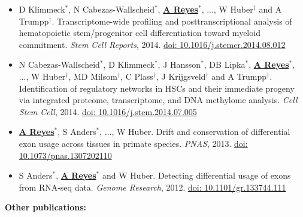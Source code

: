 \documentclass[11pt,a4paper,sans]{moderncv} %
\begin{document}
\begin{itemize}
\item D Klimmeck$^{\ast}$, N Cabezas-Wallscheid$^{\ast}$, \textbf{\underline{A Reyes}}$^{\ast}$, ..., W Huber$^{\dagger}$ and A Trumpp$^{\dagger}$. Transcriptome-wide profiling and posttranscriptional analysis of hematopoietic stem/progenitor cell differentiation toward myeloid commitment. \textit{Stem Cell Reports}, 2014. \href{https://doi.org/10.1016/j.stemcr.2014.08.012}{doi: 10.1016/j.stemcr.2014.08.012}
\item N Cabezas-Wallscheid$^{\ast}$, D Klimmeck$^{\ast}$, J Hansson$^{\ast}$, DB Lipka$^{\ast}$, \textbf{\underline{A Reyes}}$^{\ast}$, ..., W Huber$^{\dagger}$, MD Milsom$^{\dagger}$, C Plass$^{\dagger}$, J Krijgsveld$^{\dagger}$ and A Trumpp$^{\dagger}$. Identification of regulatory networks in HSCs and their immediate progeny via integrated proteome, transcriptome, and DNA methylome analysis. \textit{Cell Stem Cell}, 2014. \href{https://doi.org/10.1016/j.stem.2014.07.005}{doi: 10.1016/j.stem.2014.07.005}
\item \textbf{\underline{A Reyes}}$^{\ast}$, S Anders$^{\ast}$, ..., W Huber. Drift and conservation of differential exon usage across tissues in primate species. \textit{PNAS}, 2013. \href{https://doi.org/10.1073/pnas.1307202110}{doi: 10.1073/pnas.1307202110}
\item S Anders$^{\ast}$, \textbf{\underline{A Reyes}}$^{\ast}$ and W Huber. Detecting differential usage of exons from RNA-seq data. \textit{Genome Research}, 2012. \href{https://doi.org/10.1101/gr.133744.111}{doi: 10.1101/gr.133744.111}
\end{itemize}
\vspace{.1cm}
\textbf{Other publications:}
\vspace{.1cm}
\end{document}
